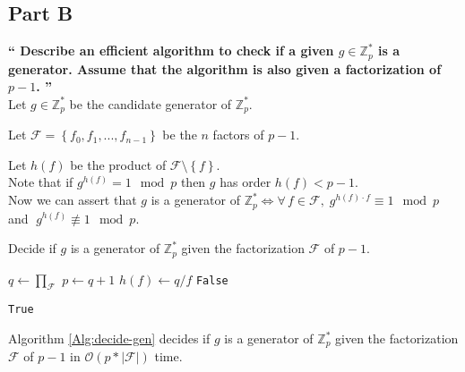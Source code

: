 \documentclass{article}
\newcommand{\HomeworkText}[1]{\textbf{``#1''}\\}
\begin{document}
	\subsection*{Part B}
	\HomeworkText{
		Describe an efficient algorithm to check if a given $g \in \mathbb{Z}^{*}_{p}$ is a generator. Assume that the algorithm is also given a factorization of $p - 1$.
	}

	Let $g \in \mathbb{Z}^{*}_{p}$ be the candidate generator of $\mathbb{Z}^{*}_{p}$.

	Let $\mathcal{F} = \left\{f_0, f_1, ... , f_{n-1}\right\}$ be the $n$ factors of $p-1$.
	
	Let $h(f)$ be the product of $\mathcal{F} \setminus \left\{ f \right\}$.\\
	
	Note that if $g^{h(f)} = 1 \mod p$ then $g$ has order $h(f) < p - 1$.\\

    Now we can assert that $g$ is a generator of $\mathbb{Z}^{*}_{p} \iff \forall\, f \in \mathcal{F},\; g^{h(f)\cdot f} \equiv 1 \mod p\;$ and $\;g^{h(f)} \not \equiv 1 \mod p$. 
    
        \begin{algorithm}
    	\label{Alg:decide-gen}
    	\caption{Decide if $g$ is a generator of $\mathbb{Z}^{*}_{p}$ given the factorization $\mathcal{F}$ of $p - 1$.}
    	\label{Alg:deriveAlignment}
    	\begin{algorithmic}[1]
    		\State $q \gets \prod_{\mathcal{F}}$
    		\State $p \gets q + 1$
    		\State $h(f) \gets q / f$
    		  \State \Return \texttt{False}
    		\EndIf
    		\EndFor
    		
    		\State \Return \texttt{True}

    		\EndFunction
    	\end{algorithmic}
    \end{algorithm}

	Algorithm \ref{Alg:decide-gen} decides if $g$ is a generator of $\mathbb{Z}^{*}_{p}$ given the factorization $\mathcal{F}$ of $p - 1$ in $\mathcal{O}(p*|\mathcal{F}|)$ time.
\end{document}

